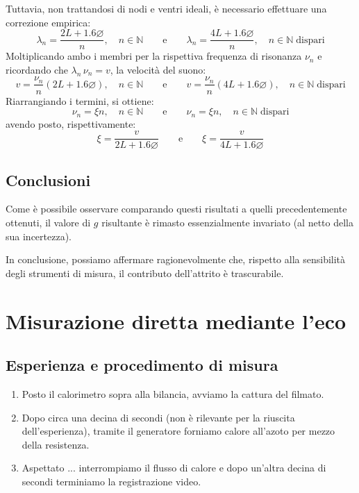 \documentclass{article}
\newcommand*{\diam}{\varnothing}
\begin{document}
Tuttavia, non trattandosi di nodi e ventri ideali, è necessario effettuare
una correzione empirica:
\[
  \lambda_n = \frac{2L + 1.6 \diam}{n},\quad n\in\mathbb{N}
  \qquad\text{e}\qquad
  \lambda_n = \frac{4L + 1.6 \diam}{n},\quad n\in\mathbb{N}\;\text{dispari}
\]
Moltiplicando ambo i membri per la rispettiva frequenza di risonanza $\nu_n$
e ricordando che $\lambda_n\,\nu_n = v$, la velocità del suono:
\[
  v = \frac{\nu_n}{n}(2L + 1.6 \diam),\quad n\in\mathbb{N}
  \qquad\text{e}\qquad
  v = \frac{\nu_n}{n}(4L + 1.6 \diam),\quad n\in\mathbb{N}\;\text{dispari}
\]
Riarrangiando i termini, si ottiene:
\[
  \nu_n = \xi n,\quad n\in\mathbb{N}
  \qquad\text{e}\qquad
  \nu_n = \xi n,\quad n\in\mathbb{N}\;\text{dispari}
\]
avendo posto, rispettivamente:
\[
  \xi = \frac{v}{2L + 1.6 \diam}
  \qquad\text{e}\qquad
  \xi = \frac{v}{4L + 1.6 \diam}
\]


\subsection{Conclusioni}

Come è possibile osservare comparando questi risultati a
quelli precedentemente ottenuti, il valore di $g$ risultante
è rimasto essenzialmente invariato (al netto della sua incertezza).

In conclusione, possiamo affermare ragionevolmente che,
rispetto alla sensibilità degli strumenti di misura,
il contributo dell'attrito è trascurabile.

\section{Misurazione diretta mediante l'eco}

\subsection{Esperienza e procedimento di misura}

\begin{enumerate}
  \item
    Posto il calorimetro sopra alla bilancia, avviamo la cattura del filmato.
  \item
    Dopo circa una decina di secondi (non è rilevante per la riuscita dell'esperienza),
    tramite il generatore forniamo calore all'azoto per mezzo della resistenza.
  \item
    Aspettato ... interrompiamo il flusso di calore e dopo
    un'altra decina di secondi terminiamo la registrazione video.
\end{enumerate}
\end{document}
